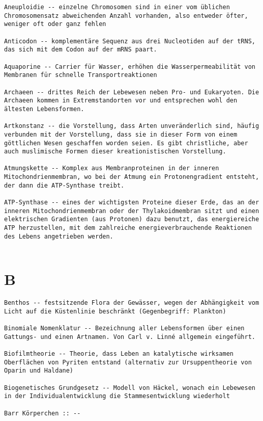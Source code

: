 \documentclass{article}
\begin{document}
\begin{verbatim}
Aneuploidie -- einzelne Chromosomen sind in einer vom üblichen Chromosomensatz abweichenden Anzahl vorhanden, also entweder öfter, weniger oft oder ganz fehlen

Anticodon -- komplementäre Sequenz aus drei Nucleotiden auf der tRNS, das sich mit dem Codon auf der mRNS paart.

Aquaporine -- Carrier für Wasser, erhöhen die Wasserpermeabilität von Membranen für schnelle Transportreaktionen

Archaeen -- drittes Reich der Lebewesen neben Pro- und Eukaryoten. Die Archaeen kommen in Extremstandorten vor und entsprechen wohl den ältesten Lebensformen.

Artkonstanz -- die Vorstellung, dass Arten unveränderlich sind, häufig verbunden mit der Vorstellung, dass sie in dieser Form von einem göttlichen Wesen geschaffen worden seien. Es gibt christliche, aber auch muslimische Formen dieser kreationistischen Vorstellung.

Atmungskette -- Komplex aus Membranproteinen in der inneren Mitochondrienmembran, wo bei der Atmung ein Protonengradient entsteht, der dann die ATP-Synthase treibt.

ATP-Synthase -- eines der wichtigsten Proteine dieser Erde, das an der inneren Mitochondrienmembran oder der Thylakoidmembran sitzt und einen elektrischen Gradienten (aus Protonen) dazu benutzt, das energiereiche ATP herzustellen, mit dem zahlreiche energieverbrauchende Reaktionen des Lebens angetrieben werden.
    
\end{verbatim}
\newpage


\section{B}
\begin{verbatim}
Benthos -- festsitzende Flora der Gewässer, wegen der Abhängigkeit vom Licht auf die Küstenlinie beschränkt (Gegenbegriff: Plankton)

Binomiale Nomenklatur -- Bezeichnung aller Lebensformen über einen Gattungs- und einen Artnamen. Von Carl v. Linné allgemein eingeführt.

Biofilmtheorie -- Theorie, dass Leben an katalytische wirksamen Oberflächen von Pyriten entstand (alternativ zur Ursuppentheorie von Oparin und Haldane)

Biogenetisches Grundgesetz -- Modell von Häckel, wonach ein Lebewesen in der Individualentwicklung die Stammesentwicklung wiederholt

Barr Körperchen :: --
\end{verbatim}
\newpage
\end{document}
